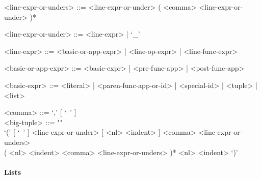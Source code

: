 \documentclass{article}
\begin{document}
\begin{itemize}
\begin{grammar}
<line-expr-or-unders> ::=
<line-expr-or-under> ( <comma> <line-expr-or-under> )*

<line-expr-or-under> ::= <line-expr> | `_'

<line-expr> ::= <basic-or-app-expr> | <line-op-expr> | <line-func-expr>

<basic-or-app-expr> ::= <basic-expr> | <pre-func-app> | <post-func-app>

<basic-expr> ::=
<literal> | <paren-func-app-or-id> | <special-id> | <tuple> | <list>

<comma> ::= `,' [ `\ ' ]
\\

<big-tuple> ::= ""\\
`(' [ `\ ' ] <line-expr-or-under> [ <nl> <indent> ]
<comma> <line-expr-or-unders> \\
( <nl> <indent> <comma> <line-expr-or-unders> )*
<nl> <indent> `)'
\end{grammar}

\end{itemize}

\paragraph{Lists}
\end{document}
